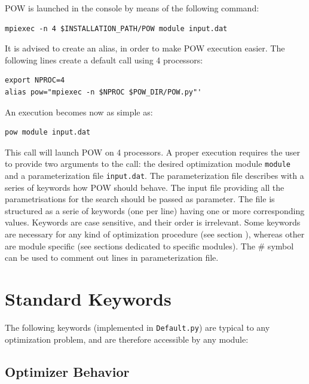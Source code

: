 \documentclass[a4paper, 12pt]{article}
\begin{document}
POW is launched in the console by means of the following command:
\begin{verbatim}
mpiexec -n 4 $INSTALLATION_PATH/POW module input.dat
\end{verbatim}
It is advised to create an alias, in order to make POW execution easier. The following lines create a default call using 4 processors:
\begin{verbatim}
export NPROC=4
alias pow="mpiexec -n $NPROC $POW_DIR/POW.py"'
\end{verbatim}
An execution becomes now as simple as:
\begin{verbatim}
pow module input.dat
\end{verbatim}
This call will launch POW on 4 processors. A proper execution requires the user to provide two arguments to the call: the desired optimization module \texttt{module} and a parameterization file \texttt{input.dat}. The parameterization file describes with a series of keywords how POW should behave. The input file providing all the parametrisations for the search should be passed as parameter. The file is structured as a serie of keywords (one per line) having one or more corresponding values. Keywords are case sensitive, and their order is irrelevant. Some keywords are necessary for any kind of optimization procedure (see section \label{default}), whereas other are module specific (see sections dedicated to specific modules). The \# symbol can be used to comment out lines in parameterization file.


\section{Standard Keywords \label{default}}

The following keywords (implemented in \texttt{Default.py}) are typical to any optimization problem, and are therefore accessible by any module:

\subsection{Optimizer Behavior}
\end{document}
